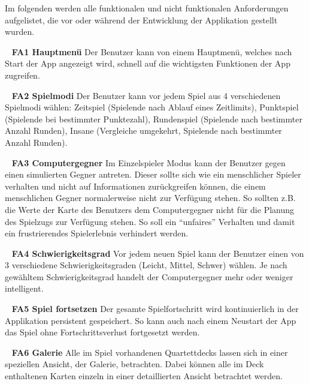 \documentclass{scrartcl}
\begin{document}
Im folgenden werden alle funktionalen und nicht funktionalen Anforderungen
aufgelistet, die vor oder während der Entwicklung der Applikation gestellt
wurden.

\ \newline
\textbf{FA1 Hauptmenü} \newline
Der Benutzer kann von einem Hauptmenü, welches nach Start der App angezeigt
wird, schnell auf die wichtigsten Funktionen der App zugreifen.

\ \newline
\textbf{FA2 Spielmodi} \newline
Der Benutzer kann vor jedem Spiel aus 4 verschiedenen Spielmodi wählen:
Zeitspiel (Spielende nach Ablauf eines Zeitlimits), Punktspiel (Spielende bei
bestimmter Punktezahl), Rundenspiel (Spielende nach bestimmter Anzahl Runden),
Insane (Vergleiche umgekehrt, Spielende nach bestimmter Anzahl Runden).

\ \newline
\textbf{FA3 Computergegner} \newline
Im Einzelspieler Modus kann der Benutzer gegen einen simulierten Gegner
antreten. Dieser sollte sich wie ein menschlicher Spieler verhalten und nicht
auf Informationen zurückgreifen können, die einem menschlichen Gegner
normalerweise nicht zur Verfügung stehen. So sollten z.B. die Werte der Karte
des Benutzers dem Computergegner nicht für die Planung des Spielzugs zur
Verfügung stehen. So soll ein \enquote{unfaires} Verhalten und damit ein
frustrierendes Spielerlebnis verhindert werden.

\ \newline
\textbf{FA4 Schwierigkeitsgrad} \newline
Vor jedem neuen Spiel kann der Benutzer einen von 3 verschiedene
Schwierigkeitsgraden (Leicht, Mittel, Schwer) wählen. Je nach gewähltem
Schwierigkeitsgrad handelt der Computergegner mehr oder weniger intelligent.

\ \newline
\textbf{FA5 Spiel fortsetzen} \newline
Der gesamte Spielfortschritt wird kontinuierlich in der Applikation persistent
gespeichert. So kann auch nach einem Neustart der App das Spiel ohne
Fortschrittsverlust fortgesetzt werden.

\ \newline
\textbf{FA6 Galerie} \newline
Alle im Spiel vorhandenen Quartettdecks lassen sich in einer speziellen Ansicht,
der Galerie, betrachten. Dabei können alle im Deck enthaltenen Karten einzeln
in einer detaillierten Ansicht betrachtet werden.
\end{document}

